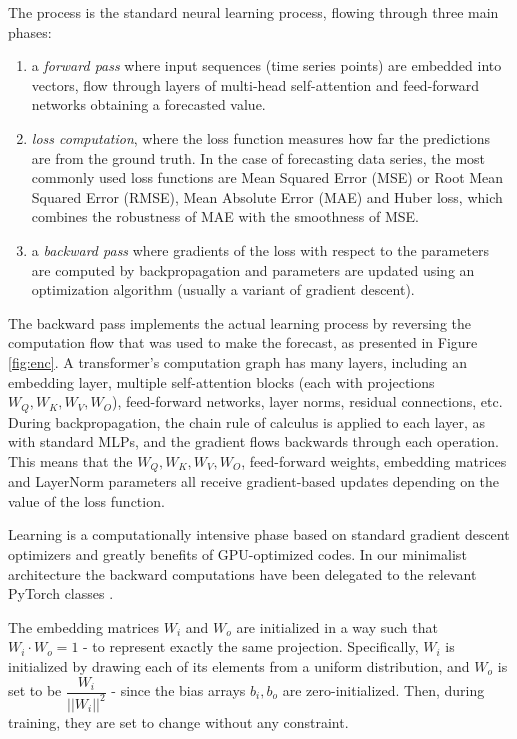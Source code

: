 \documentclass[algorithms,article,submit,pdftex,moreauthors]{Definitions/mdpi}
\begin{document}
The process is the standard neural learning process, flowing through three main phases:
\begin{enumerate}
    \item a {\it forward pass} where input sequences (time series points) are embedded into vectors, flow through layers of multi-head self-attention and feed-forward networks obtaining a forecasted value.

    \item {\it loss computation}, where the loss function measures how far the predictions are from the ground truth. In the case of forecasting data series, the most commonly used loss functions are Mean Squared Error (MSE) or Root Mean Squared Error (RMSE), Mean Absolute Error (MAE) and Huber loss, which combines the robustness of MAE with the smoothness of MSE.

    \item a {\it backward pass} where gradients of the loss with respect to the parameters are computed by backpropagation and parameters are updated using an optimization algorithm (usually a variant of gradient descent).
\end{enumerate}

The backward pass implements the actual learning process by reversing the computation flow that was used to make the forecast, as presented in Figure \ref{fig:enc}. A transformer's computation graph has many layers, including an embedding layer, multiple self-attention blocks (each with projections $W_Q, W_K, W_V, W_O$), feed-forward networks, layer norms, residual connections, etc. During backpropagation, the chain rule of calculus is applied to each layer, as with standard MLPs, and the gradient flows backwards through each operation. This means that the $W_Q, W_K, W_V, W_O$, feed-forward weights, embedding matrices and LayerNorm parameters all receive gradient-based updates depending on the value of the loss function.

Learning is a computationally intensive phase based on standard gradient descent optimizers and greatly benefits of GPU-optimized codes. In our minimalist architecture the backward computations have been delegated to the relevant PyTorch classes  \cite{PyTorch25}.

The embedding matrices $W_i$ and $W_o$ are initialized in a way such that $W_i \cdot W_o = 1$ - to represent exactly the same projection. Specifically, $W_i$ is initialized by drawing each of its elements from a uniform distribution, and $W_o$ is set to be $\dfrac{W_i}{||W_i||^2}$ - since the bias arrays $b_i, b_o$ are zero-initialized. Then, during training, they are set to change without any constraint.
\end{document}
